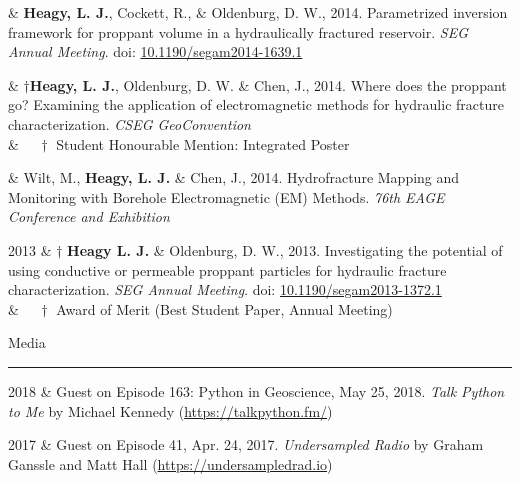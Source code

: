 \documentclass[a4paper, 11pt]{article}
\newcommand{\doi}[1]{doi: \href{https://doi.org/#1}{#1}}
\newcommand{\heading}[1]{
    \begin{minipage}[t]{\textwidth}
    \vspace{0.05cm}
    {\LARGE #1}\\
    \vspace{-0.24cm}
    \hrule
    \end{minipage}
    \vspace{0.05cm}

}
\begin{document}
\begin{entryright}
& \textbf{Heagy, L. J.}, Cockett, R., \& Oldenburg, D. W., 2014. Parametrized inversion framework for proppant volume in a hydraulically fractured reservoir. \emph{SEG Annual Meeting}. \doi{10.1190/segam2014-1639.1}
\end{entryright}

\begin{entryright}
& $\dagger$\textbf{Heagy, L. J.}, Oldenburg, D. W. \& Chen, J., 2014. Where does the proppant go? Examining the application of electromagnetic methods for hydraulic fracture characterization. \emph{CSEG GeoConvention} \\
& $\quad \dagger$ Student Honourable Mention: Integrated Poster
\end{entryright}

\begin{entryright}
& Wilt, M., \textbf{Heagy, L. J.} \& Chen, J., 2014. Hydrofracture Mapping and Monitoring with Borehole Electromagnetic (EM) Methods. \emph{76th EAGE Conference and Exhibition}
\end{entryright}

\begin{entryright}
2013 & $\dagger$ \textbf{Heagy L. J.} \& Oldenburg, D. W., 2013. Investigating the potential of using conductive or permeable proppant particles for hydraulic fracture characterization. \emph{SEG Annual Meeting}. \doi{10.1190/segam2013-1372.1} \\
& $\quad\dagger$ Award of Merit (Best Student Paper, Annual Meeting)
\end{entryright}




\heading{Media}

\begin{entryright}
2018 & Guest on Episode 163: Python in Geoscience, May 25, 2018. \emph{Talk Python to Me} by Michael Kennedy (\href{https://talkpython.fm/episodes/show/163/python-in-geoscience}{https://talkpython.fm/})
\end{entryright}

\begin{entryright}
2017 & Guest on Episode 41, Apr. 24, 2017. \emph{Undersampled Radio} by Graham Ganssle and Matt Hall (\href{https://undersampledrad.io/home/2017/4/inverterizer}{https://undersampledrad.io})
\end{entryright}
\end{document}
